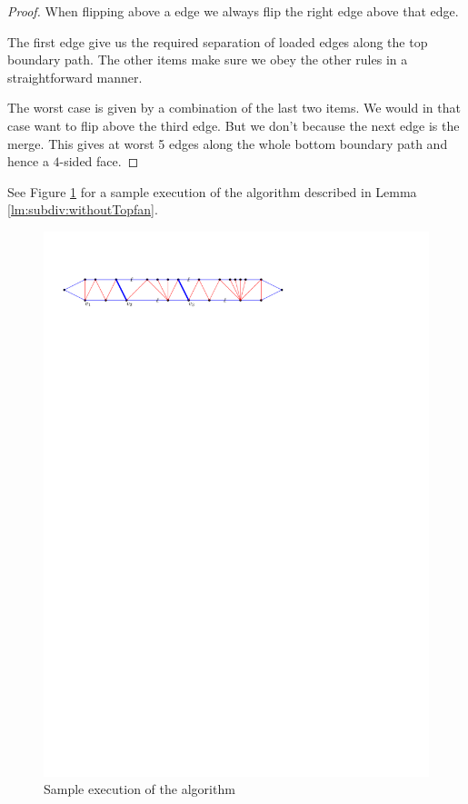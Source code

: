 \begin{proof}
  When flipping above a edge we always flip the right edge above that edge.

  The first edge give us the required separation of loaded edges along the top boundary path. The other items make sure we obey the other rules in a straightforward manner.

  The worst case is given by a combination of the last two items. We would in that case want to flip above the third edge. But we don't because the next edge is the merge. This gives at worst 5 edges along the whole bottom boundary path and hence a $4$-sided face.



\end{proof}

See Figure \ref{fig:subdiv:sampleExecution} for a sample execution of the algorithm described in Lemma \ref{lm:subdiv:withoutTopfan}.

\begin{figure}[h]
  \centering
  \includegraphics[scale=1]{blueFaceSubdivision/img/sampleExecution}
  \caption{Sample execution of the algorithm}
  \label{fig:subdiv:sampleExecution}
\end{figure}


